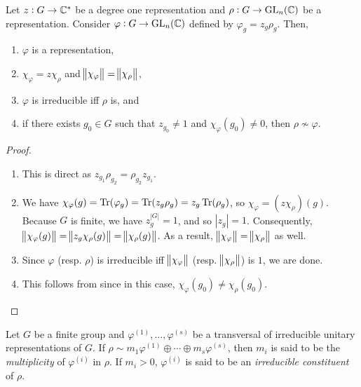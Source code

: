 		\begin{fcor}
			Let $z : G \to \mathbb{C}^*$ be a degree one representation and $\rho : G \to \operatorname{GL}_n(\mathbb{C})$ be a representation. Consider $\varphi : G \to \operatorname{GL}_n(\mathbb{C})$ defined by $\varphi_g = z_g \rho_g$. Then,
			\begin{enumerate}[label=(\alph*)]
				\item $\varphi$ is a representation,
				\item $\chi_\varphi = z \chi_\rho$ and $\norm{\chi_\varphi} = \norm{\chi_\rho}$,
				\item $\varphi$ is irreducible iff $\rho$ is, and
				\item if there exists $g_0 \in G$ such that $z_{g_0} \ne 1$ and $\chi_\varphi(g_0) \ne 0$, then $\rho \not\sim \varphi$.
			\end{enumerate}
		\end{fcor}
		\begin{proof}
			\phantom{pain}
			\begin{enumerate}[label=(\alph*)]
				\item This is direct as $z_{g_1} \rho_{g_2} = \rho_{g_2} z_{g_1}$.

				\item We have $\chi_\varphi(g) = \operatorname{Tr}(\varphi_g) = \operatorname{Tr}(z_g \rho_g) = z_g \operatorname{Tr}(\rho_g)$, so $\chi_\varphi = (z \chi_\rho)(g)$.\\
				Because $G$ is finite, we have $z_g^{|G|} = 1$, and so $|z_g| = 1$. Consequently, $\norm{\chi_\varphi(g)} = \norm{z_g \chi_\rho(g)} = \norm{\chi_\rho(g)}$. As a result, $\norm{\chi_\varphi} = \norm{\chi_\rho}$ as well.

				\item Since $\varphi$ (resp. $\rho$) is irreducible iff $\norm{\chi_\varphi}$ (resp. $\norm{\chi_\rho}$) is $1$, we are done.

				\item This follows from  since in this case, $\chi_\varphi(g_0) \ne \chi_\rho(g_0)$.
			\end{enumerate}
		\end{proof}


		\begin{fdef}
			Let $G$ be a finite group and $\varphi^{(1)},\ldots,\varphi^{(s)}$ be a transversal of irreducible unitary representations of $G$. If $\rho \sim m_1 \varphi^{(1)} \oplus \cdots \oplus m_s \varphi^{(s)}$, then $m_i$ is said to be the \emph{multiplicity} of $\varphi^{(i)}$ in $\rho$. If $m_i > 0$, $\varphi^{(i)}$ is said to be an \emph{irreducible constituent} of $\rho$.
		\end{fdef}

